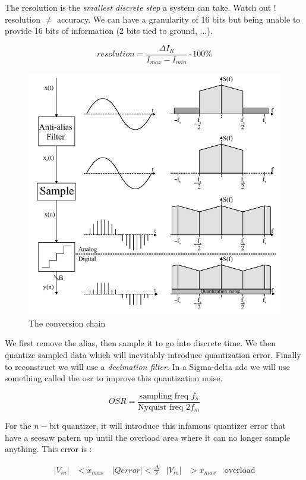 \documentclass{report}
\begin{document}
The resolution is the \textit{smallest discrete step} a system can take. Watch out ! resolution $\neq$ accuracy. We can have a granularity of 16 bits but being unable to provide 16 bits of information (2 bits tied to ground, ...).

\begin{equation}
    resolution = \frac{\Delta I_R}{I_{max} - I_{min}} \cdot 100 \%
\end{equation}

\begin{figure}[H]
    \centering
    \includegraphics[width=0.65\linewidth]{conversion_chain.png}
    \caption{The conversion chain}
    \label{fig:conversion-chain-label}
\end{figure}

We first remove the alias, then sample it to go into discrete time. We then quantize sampled data which will inevitably introduce quantization error. Finally to reconstruct we will use a \textit{decimation filter}. In a Sigma-delta \gls{adc} we will use something called the \gls{osr} to improve this quantization noise.

\begin{equation}
    OSR = \frac{\text{sampling freq } f_s}{\text{Nyquist freq } 2 f_m}
\end{equation}

For the $n-$bit quantizer, it will introduce this infamous quantizer error that have a seesaw patern up until the overload area where it can no longer sample anything. This error is :

\begin{align}
    |V_{in}| &< x_{max} \quad |Q error| < \frac{\Delta}{2} & |V_{in}| &> x_{max} \quad \text{overload}
\end{align}
\end{document}
